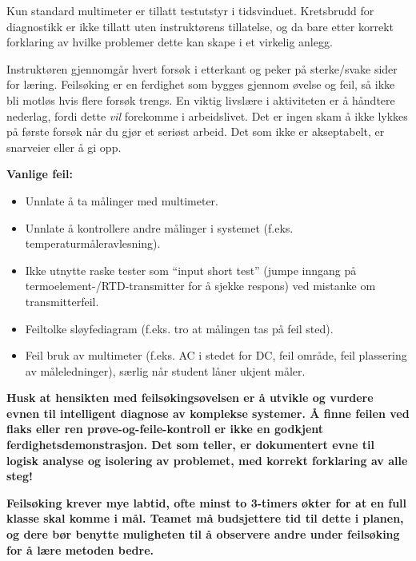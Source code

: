 Kun standard multimeter er tillatt testutstyr i tidsvinduet. Kretsbrudd for diagnostikk er ikke tillatt uten instruktørens tillatelse, og da bare etter korrekt forklaring av hvilke problemer dette kan skape i et virkelig anlegg.

Instruktøren gjennomgår hvert forsøk i etterkant og peker på sterke/svake sider for læring. Feilsøking er en ferdighet som bygges gjennom øvelse og feil, så ikke bli motløs hvis flere forsøk trengs. En viktig livslære i aktiviteten er å håndtere nederlag, fordi dette {\it vil} forekomme i arbeidslivet. Det er ingen skam å ikke lykkes på første forsøk når du gjør et seriøst arbeid. Det som ikke er akseptabelt, er snarveier eller å gi opp.

\vskip 10pt

{\bf Vanlige feil:}

\begin{itemize}
\item{} Unnlate å ta målinger med multimeter.
\item{} Unnlate å kontrollere andre målinger i systemet (f.eks. temperaturmåleravlesning).
\item{} Ikke utnytte raske tester som ``input short test'' (jumpe inngang på termoelement-/RTD-transmitter for å sjekke respons) ved mistanke om transmitterfeil.
\item{} Feiltolke sløyfediagram (f.eks. tro at målingen tas på feil sted).
\item{} Feil bruk av multimeter (f.eks. AC i stedet for DC, feil område, feil plassering av måleledninger), særlig når student låner ukjent måler.
\end{itemize}

\vskip 10pt

{\bf Husk at hensikten med feilsøkingsøvelsen er å utvikle og vurdere evnen til intelligent diagnose av komplekse systemer. Å finne feilen ved flaks eller ren prøve-og-feile-kontroll er ikke en godkjent ferdighetsdemonstrasjon. Det som teller, er dokumentert evne til logisk analyse og isolering av problemet, med korrekt forklaring av alle steg!}

\vskip 10pt

{\bf Feilsøking krever mye labtid, ofte minst to 3-timers økter for at en full klasse skal komme i mål. Teamet må budsjettere tid til dette i planen, og dere bør benytte muligheten til å observere andre under feilsøking for å lære metoden bedre.}



\vfil \eject

